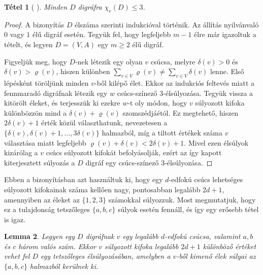 \documentclass[12pt, a4paper]{report}
\newtheorem{tét}{Tétel}[section]
\newtheorem{lem}[tét]{Lemma}
\theoremstyle{remark}
\theoremstyle{definition}
\begin{document}
\begin{tét}[\citeauthor{Baudon2014} \cite{Baudon2014}]
Minden $D$ digráfra $\chi_e(D) \leq 3$.
\end{tét}

\begin{proof}
A bizonyítás $D$ élszáma szerinti indukcióval történik. Az állítás nyilvánvaló $0$ vagy $1$ élű digráf esetén. Tegyük fel, hogy legfeljebb $m - 1$ élre már igazoltuk a tételt, és legyen $D = (V, A)$ egy $m \geq 2$ élű digráf.

Figyeljük meg, hogy $D$-nek létezik egy olyan $v$ csúcsa, melyre $\delta(v) > 0$ és $\delta(v) > \varrho(v)$, hiszen különben $\sum\limits_{v \in V} \varrho(v) \neq \sum\limits_{v \in V} \delta(v)$ lenne. Első lépésként töröljünk minden $v$-ből kilépő élet. Ekkor az indukciós feltevés miatt a fennmaradó digráfnak létezik egy $w$ csúcs-színező 3-élsúlyozása. Tegyük vissza a kitörölt éleket, és terjesszük ki ezekre $w$-t oly módon, hogy $v$ súlyozott kifoka különbözzön mind a $\delta(v) + \varrho(v)$ szomszédjáétól. Ez megtehető, hiszen $2\delta(v) + 1$ érték közül választhatunk, nevezetesen a $\lbrace \delta(v), \delta(v) + 1, \ldots, 3\delta(v) \rbrace$ halmazból, míg a tiltott értékek száma $v$ választása miatt legfeljebb $\varrho(v) + \delta(v) < 2\delta(v) + 1$. Mivel ezen élsúlyok kizárólag a $v$ csúcs súlyozott kifokát befolyásolják, ezért az így kapott kiterjesztett súlyozás a $D$ digráf egy csúcs-színező 3-élsúlyozása.
\end{proof}

Ebben a bizonyításban azt használtuk ki, hogy egy $d$-edfokú csúcs lehetséges súlyozott kifokainak száma kellően nagy, pontosabban legalább $2d + 1$, amennyiben az éleket az $\lbrace 1, 2, 3 \rbrace$ számokkal súlyozzuk. Most megmutatjuk, hogy ez a tulajdonság tetszőleges $\lbrace a, b, c \rbrace$ súlyok esetén fennáll, és így egy erősebb tétel is igaz.

\begin{lem}
Legyen egy $D$ digráfnak $v$ egy legalább $d$-edfokú csúcsa, valamint $a, b$ és $c$ három valós szám. Ekkor $v$ súlyozott kifoka legalább $2d + 1$ különböző értéket vehet fel $D$ egy tetszőleges élsúlyozásában, amelyben a $v$-ből kimenő élek súlyai az $\lbrace a, b, c \rbrace$ halmazból kerülnek ki.
\end{lem}
\end{document}
